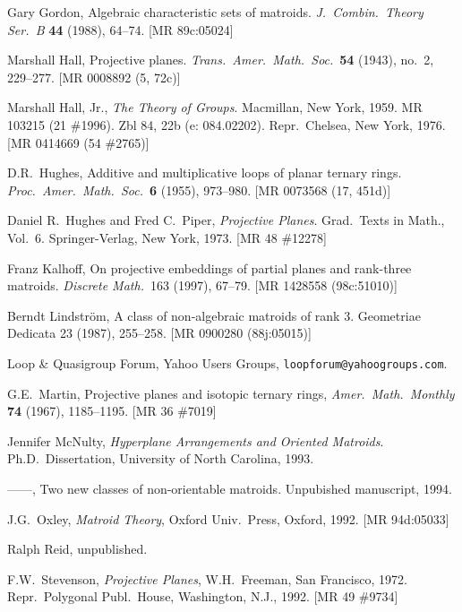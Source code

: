 \documentclass[reqno,12pt]{amsart}
\theoremstyle{remark}
\numberwithin{equation}{section}
\numberwithin{figure}{section}
\begin{document}
\begin{thebibliography}{99}
 Gary Gordon, 
Algebraic characteristic sets of matroids.
\emph{J.\ Combin.\ Theory Ser.\ B} {\bf 44} (1988), 64--74.
[MR 89c:05024]  %

  Marshall Hall, 
Projective planes.
\emph{Trans.\ Amer.\ Math.\ Soc.}\ {\bf 54} (1943), no.\ 2, 229--277.
[MR 0008892 (5, 72c)]  %

 Marshall Hall, Jr., 
\emph{The Theory of Groups}.
Macmillan, New York, 1959.  
MR 103215 (21 \#1996).  Zbl 84, 22b (e: 084.02202).
Repr.\ Chelsea, New York, 1976.
[MR 0414669 (54 \#2765)]  %

 D.R.\ Hughes, 
Additive and multiplicative loops of planar ternary rings. 
\emph{Proc.\ Amer.\ Math.\ Soc.}\ {\bf 6} (1955), 973--980.
[MR 0073568 (17, 451d)]  %

 Daniel R.\ Hughes and Fred C.\ Piper,
\emph{Projective Planes}.
Grad.\ Texts in Math., Vol.\ 6. 
Springer-Verlag, New York, 1973.
[MR 48 \#12278]  %

 Franz Kalhoff, 
On projective embeddings of partial planes and rank-three matroids. 
\emph{Discrete Math.}\ 163 (1997), 67--79.
[MR 1428558 (98c:51010)]

 Berndt Lindstr\"om, 
A class of non-algebraic matroids of rank 3.
Geometriae Dedicata 23 (1987), 255--258.
[MR 0900280 (88j:05015)]  %

  Loop \& Quasigroup Forum, Yahoo Users Groups, {\tt loopforum@yahoogroups.com}.

 G.E.~Martin, 
Projective planes and isotopic ternary rings,  
\emph{Amer.\ Math.\ Monthly} {\bf 74} (1967), 1185--1195.
[MR 36 \#7019]  %

 Jennifer McNulty,
\emph{Hyperplane Arrangements and Oriented Matroids}.
Ph.D.\ Dissertation, University of North Carolina, 1993.

 ------,
Two new classes of non-orientable matroids.
Unpubished manuscript, 1994.

 J.G.\ Oxley,
\emph{Matroid Theory},  
Oxford Univ.\ Press, Oxford, 1992.
[MR 94d:05033]  %

 Ralph Reid, 
unpublished.

 F.W.\ Stevenson,   
\emph{Projective Planes},
W.H.\ Freeman, San Francisco, 1972.
Repr.\ Polygonal Publ.\ House, Washington, N.J., 1992.
[MR 49 \#9734]  %


\end{thebibliography}
\end{document}
